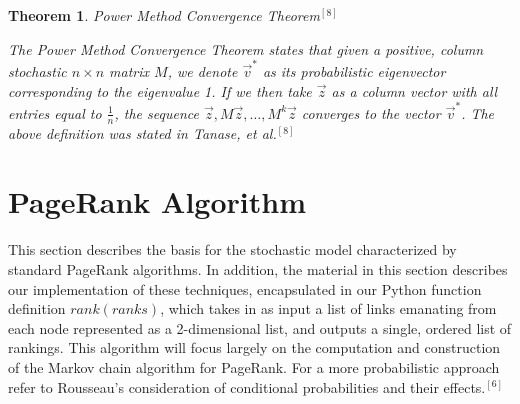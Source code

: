 \documentclass{article}
\newtheorem{theorem}{Theorem}
\begin{document}
    \begin{theorem}{Power Method Convergence Theorem$^{[8]}$}
    
    \noindent
    \textup{The Power Method Convergence Theorem states that given a positive, column stochastic $n \times n$ matrix $M$, we denote $\Vec{v}^*$ as its probabilistic eigenvector corresponding to the eigenvalue 1. If we then take $\Vec{z}$ as a column vector with all entries equal to $\frac{1}{n}$, the sequence $\Vec{z}, M\Vec{z}, \ldots, M^k\Vec{z}$ converges to the vector $\Vec{v}^*$. The above definition was stated in Tanase, et al.$^{[8]}$}
    \end{theorem}
    
\section{PageRank Algorithm}
    This section describes the basis for the stochastic model characterized by standard PageRank algorithms. In addition, the material in this section describes our implementation of these techniques, encapsulated in our Python function definition $rank(ranks)$, which takes in as input a list of links emanating from each node represented as a 2-dimensional list, and outputs a single, ordered list of rankings. This algorithm will focus largely on the computation and construction of the Markov chain algorithm for PageRank. For a more probabilistic approach refer to Rousseau's consideration of conditional probabilities and their effects.$^{[6]}$
    
\end{document}

